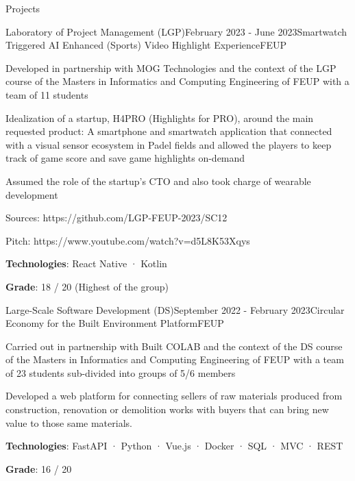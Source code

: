 \documentclass[
	11pt, %
]{cv} %
\begin{document}
\begin{rSection}{Projects}
	
	\begin{rSubsection}{Laboratory of Project Management (LGP)}{February 2023 - June 2023}{Smartwatch Triggered AI Enhanced (Sports) Video Highlight Experience}{FEUP}
		\item Developed in partnership with MOG Technologies and the context of the LGP course of the Masters in Informatics and Computing Engineering of FEUP with a team of 11 students
		\item Idealization of a startup, H4PRO (Highlights for PRO), around the main requested product: A smartphone and smartwatch application that connected with a visual sensor ecosystem in Padel fields and allowed the players to keep track of game score and save game highlights on-demand 
		\item Assumed the role of the startup’s CTO and also took charge of wearable development
		\item Sources: https://github.com/LGP-FEUP-2023/SC12
		\item Pitch: https://www.youtube.com/watch?v=d5L8K53Xqys
		\item \textbf{Technologies}: React Native · Kotlin
		\item \textbf{Grade}: 18 / 20 (Highest of the group)
	\end{rSubsection}
	
	\begin{rSubsection}{Large-Scale Software Development (DS)}{September 2022 - February 2023}{Circular Economy for the Built Environment Platform}{FEUP}
		\item Carried out in partnership with Built COLAB and the context of the DS course of the Masters in Informatics and Computing Engineering of FEUP with a team of 23 students sub-divided into groups of 5/6 members
		\item Developed a web platform for connecting sellers of raw materials produced from construction, renovation or demolition works with buyers that can bring new value to those same materials.
		\item \textbf{Technologies}: FastAPI · Python · Vue.js · Docker · SQL · MVC · REST
		\item \textbf{Grade}: 16 / 20
	\end{rSubsection}		
			

\end{rSection}
\end{document}
